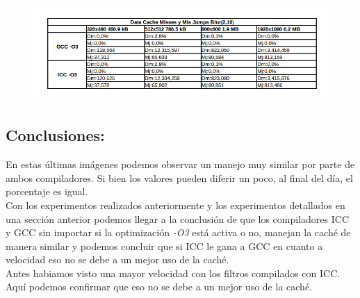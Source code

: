 \begin{figure}[H]
\begin{center}
  \includegraphics[width=\linewidth]{cachecompiladores/blur210cache.png}
\end{center}
\end{figure}

\subsection{Conclusiones:}
En estas últimas imágenes podemos observar un manejo muy similar por parte de ambos compiladores. Si bien los valores pueden diferir un poco, al final del día, el porcentaje es igual.\\
Con los experimentos realizados anteriormente y los experimentos detallados en una sección anterior podemos llegar a la conclusión de que los compiladores ICC y GCC sin importar si la optimización \textit{-O3} está activa o no, manejan la caché de manera similar y podemos concluir que si ICC le gana a GCC en cuanto a velocidad eso no se debe a un mejor uso de la caché.\\
Antes habiamos visto una mayor velocidad con los filtros compilados con ICC. Aquí podemos confirmar que eso no se debe a un mejor uso de la caché.
